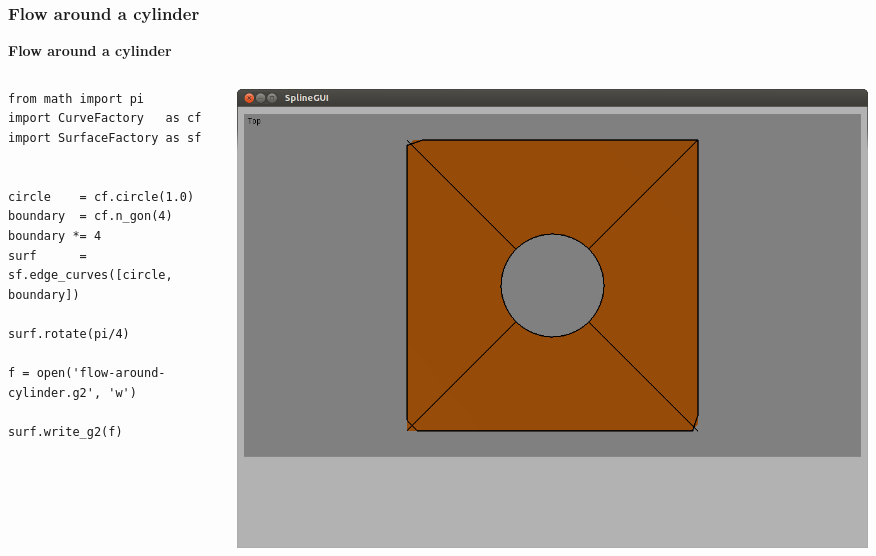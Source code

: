 \documentclass{beamer}
\theoremstyle{plain}
\theoremstyle{definition}
\begin{document}
\begin{frame}[fragile]
\frametitle{Flow around a cylinder}
\textbf{Flow around a cylinder}

\begin{columns}
    \begin{column}{.50\linewidth}
        \begin{listing}[H]
            \tiny
            \begin{verbatim}
from math import pi
import CurveFactory   as cf
import SurfaceFactory as sf


circle    = cf.circle(1.0)
boundary  = cf.n_gon(4)
boundary *= 4
surf      = sf.edge_curves([circle, boundary])

surf.rotate(pi/4)

f = open('flow-around-cylinder.g2', 'w')

surf.write_g2(f)
            \end{verbatim}
        \end{listing}
    \end{column}
    \begin{column}{.45\linewidth}
        \includegraphics[width=\linewidth]{cylinder2}
    \end{column}
\end{columns}

\end{frame}

\end{document}
